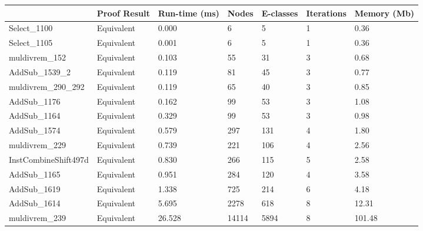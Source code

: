 \begin{tabular}{lllllll}
\toprule
 & Proof Result & Run-time (ms) & Nodes & E-classes & Iterations & Memory (Mb) \\
\midrule
Select\_1100 & Equivalent & 0.000 & 6 & 5 & 1 & 0.36 \\
Select\_1105 & Equivalent & 0.001 & 6 & 5 & 1 & 0.36 \\
muldivrem\_152 & Equivalent & 0.103 & 55 & 31 & 3 & 0.68 \\
AddSub\_1539\_2 & Equivalent & 0.119 & 81 & 45 & 3 & 0.77 \\
muldivrem\_290\_292 & Equivalent & 0.119 & 65 & 40 & 3 & 0.85 \\
AddSub\_1176 & Equivalent & 0.162 & 99 & 53 & 3 & 1.08 \\
AddSub\_1164 & Equivalent & 0.329 & 99 & 53 & 3 & 0.98 \\
AddSub\_1574 & Equivalent & 0.579 & 297 & 131 & 4 & 1.80 \\
muldivrem\_229 & Equivalent & 0.739 & 221 & 106 & 4 & 2.56 \\
InstCombineShift497d & Equivalent & 0.830 & 266 & 115 & 5 & 2.58 \\
AddSub\_1165 & Equivalent & 0.951 & 284 & 120 & 4 & 3.58 \\
AddSub\_1619 & Equivalent & 1.338 & 725 & 214 & 6 & 4.18 \\
AddSub\_1614 & Equivalent & 5.695 & 2278 & 618 & 8 & 12.31 \\
muldivrem\_239 & Equivalent & 26.528 & 14114 & 5894 & 8 & 101.48 \\
\bottomrule
\end{tabular}
